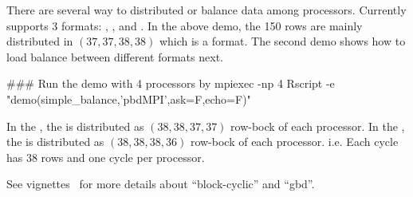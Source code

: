 There are several way to distributed or balance data among processors.
Currently  supports 3 formats: , , and
. In the above demo, the 150 rows are mainly distributed in
$(37, 37, 38, 38)$ which is a  format. The second demo shows
how to load balance between different formats next.
\begin{Command}
### Run the demo with 4 processors by
mpiexec -np 4 Rscript -e "demo(simple_balance,'pbdMPI',ask=F,echo=F)"
\end{Command}
In the , the  is distributed as $(38, 38, 37, 37)$
row-bock of each processor.
In the , the  is distributed as
$(38, 38, 38, 36)$ row-bock of each processor. i.e. Each cycle has 38
rows and one cycle per processor.

See  vignettes~\citep{Schmidt2013pbdDEMOvignette}
for more details about ``block-cyclic'' and ``gbd''.
